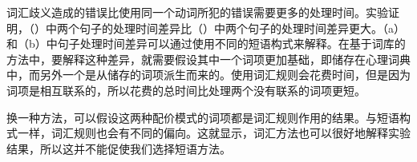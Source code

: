\begin{exe}
\begin{xlist}[iv.]
\begin{exe}
\begin{xlist}[iv.]
\zl
词汇歧义造成的错误比使用同一个动词所犯的错误需要更多的处理时间。实验证明，（）中两个句子的处理时间差异比（）中两个句子的处理时间差异更大。（a）和（b）中句子处理时间差异可以通过使用不同的短语构式来解释。在基于词库的方法中，要解释这种差异，就需要假设其中一个词项更加基础，即储存在心理词典中，而另外一个是从储存的词项派生而来的。使用词汇规则会花费时间，但是因为词项是相互联系的，所以花费的总时间比处理两个没有联系的词项更短\citep[]{Mueller2002b}。

换一种方法，可以假设这两种配价模式的词项都是词汇规则作用的结果。与短语构式一样，词汇规则也会有不同的偏向。这就显示，词汇方法也可以很好地解释实验结果，所以这并不能促使我们选择短语方法。


\end{xlist}
\end{exe}
\end{xlist}
\end{exe}
